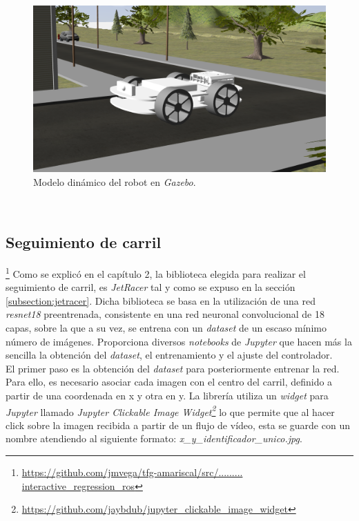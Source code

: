 \begin{figure} [h!]
	\begin{center}
		\includegraphics[width=12cm]{figs/modelGazebo}
	\end{center}
	\caption{Modelo dinámico del robot en \textit{Gazebo}.}
	\label{fig:modelGazebo}
\end{figure}\

\subsection{Seguimiento de carril}
\label{subsection:lanefollower}
\footnote{\url{https://github.com/jmvega/tfg-amariscal/src/......... interactive_regression_ros}}
Como se explicó en el capítulo 2, la biblioteca elegida para realizar el seguimiento de carril, es \textit{JetRacer} tal y como se expuso en la sección \ref{subsection:jetracer}. Dicha biblioteca se basa en la utilización de una red \textit{resnet18} preentrenada, consistente en una red neuronal convolucional de 18 capas, sobre la que a su vez, se entrena con un \textit{dataset} de un escaso mínimo número de imágenes. Proporciona diversos \textit{notebooks} de \textit{Jupyter} que hacen más la sencilla la obtención del \textit{dataset}, el entrenamiento y el ajuste del controlador.\\

El primer paso es la obtención del \textit{dataset} para posteriormente entrenar la red. Para ello, es necesario asociar cada imagen con el centro del carril, definido a partir de una coordenada en x y otra en y. La librería utiliza un \textit{widget} para \textit{Jupyter} llamado \textit{Jupyter Clickable Image Widget\footnote{\url{https://github.com/jaybdub/jupyter_clickable_image_widget}}} lo que permite que al hacer click sobre la imagen recibida a partir de un flujo de vídeo, esta se guarde con un nombre atendiendo al siguiente formato: \textit{x\_y\_identificador\_unico.jpg}.\\

